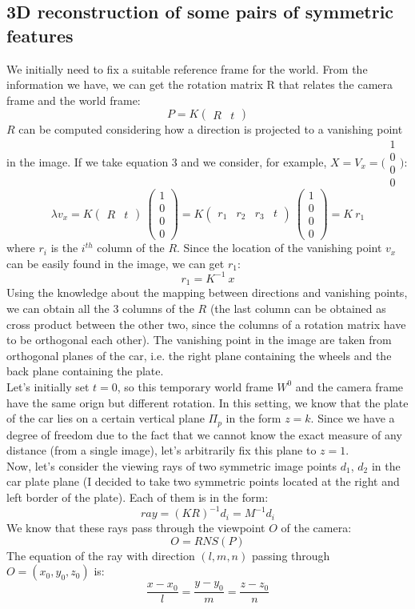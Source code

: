 \documentclass{article}
\begin{document}
\subsection{3D reconstruction of some pairs of symmetric features}
We initially need to fix a suitable reference frame for the world. From the information we have, we can get the rotation matrix R that relates the camera frame and the world frame:
$$ P = K \begin{pmatrix} R & t \end{pmatrix} $$
$R$ can be computed considering how a direction is projected to a vanishing point in the image. If we take equation 3 and we consider, for example, $X = V_x = \bigl(\begin{smallmatrix} 1 \\ 0 \\ 0 \\ 0 \end{smallmatrix} \bigr)$:
$$ \lambda v_x = K \begin{pmatrix} R & t \end{pmatrix} \: \begin{pmatrix} 1 \\ 0 \\ 0 \\ 0 \end{pmatrix} =
K \begin{pmatrix} r_1 & r_2 & r_3 & t \end{pmatrix} \: \begin{pmatrix} 1 \\ 0 \\ 0 \\ 0 \end{pmatrix} = 
K \: r_1
$$
where $r_i$ is the $i^{th}$ column of the $R$.
Since the location of the vanishing point $v_x$ can be easily found in the image, we can get $r_1$:
$$ r_1 = K^{-1} \: x $$
Using the knowledge about the mapping between directions and vanishing points, we can obtain all the 3 columns of the $R$ (the last column can be obtained as cross product between the other two, since the columns of a rotation matrix have to be orthogonal each other). The vanishing point in the image are taken from orthogonal planes of the car, i.e. the right plane containing the wheels and the back plane containing the plate.
\\
Let's initially set $t=0$, so this temporary world frame $W^0$ and the camera frame have the same orign but different rotation. In this setting, we know that the plate of the car lies on a certain vertical plane $\Pi_p$ in the form $z=k$. Since we have a degree of freedom due to the fact that we cannot know the exact measure of any distance (from a single image), let's arbitrarily fix this plane to $z=1$.
\\
Now, let's consider the viewing rays of two symmetric image points $d_1$, $d_2$ in the car plate plane (I decided to take two symmetric points located at the right and left border of the plate). Each of them is in the form:
$$ ray = (KR)^{-1}d_i = M^{-1}d_i $$
We know that these rays pass through the viewpoint $O$ of the camera:
$$ O = RNS(P) $$
The equation of the ray with direction $(l, m, n)$ passing through $O = (x_0, y_0, z_0)$ is:
$$ \frac{x-x_0}{l} = \frac{y-y_0}{m} = \frac{z-z_0}{n} $$
\end{document}
